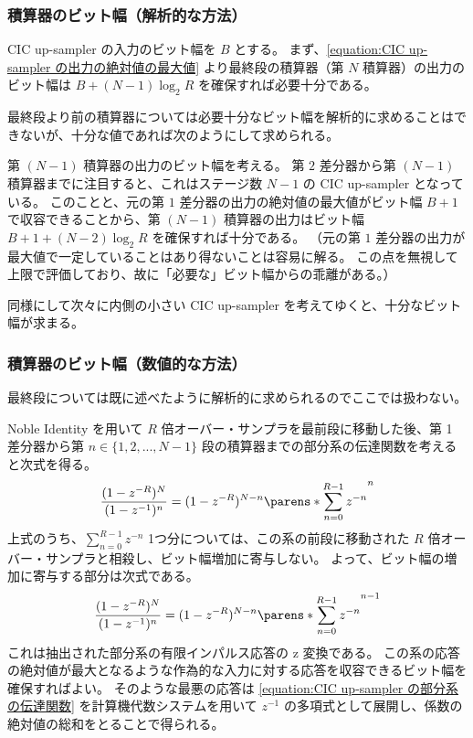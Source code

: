         \subsubsection{積算器のビット幅（解析的な方法）}
            CIC up-sampler の入力のビット幅を $B$ とする。
            まず、\cref{equation:CIC up-sampler の出力の絶対値の最大値} より最終段の積算器（第 $N$ 積算器）の出力のビット幅は $B + (N-1)\log_2 R$ を確保すれば必要十分である。
            \par
            最終段より前の積算器については必要十分なビット幅を解析的に求めることはできないが、十分な値であれば次のようにして求められる。
            \par
            第 $(N-1)$ 積算器の出力のビット幅を考える。
            第 $2$ 差分器から第 $(N-1)$ 積算器までに注目すると、これはステージ数 $N-1$ の CIC up-sampler となっている。
            このことと、元の第 $1$ 差分器の出力の絶対値の最大値がビット幅 $B+1$ で収容できることから、第 $(N-1)$ 積算器の出力はビット幅 $B + 1 + (N-2)\log_2 R$ を確保すれば十分である。
            （元の第 $1$ 差分器の出力が最大値で一定していることはあり得ないことは容易に解る。
            この点を無視して上限で評価しており、故に「必要な」ビット幅からの乖離がある。）
            \par
            同様にして次々に内側の小さい CIC up-sampler を考えてゆくと、十分なビット幅が求まる。
        \subsubsection{積算器のビット幅（数値的な方法）}
            最終段については既に述べたように解析的に求められるのでここでは扱わない。
            \par
            Noble Identity を用いて $R$ 倍オーバー・サンプラを最前段に移動した後、第 1 差分器から第 $n\in\{1,2,...,N-1\}$ 段の積算器までの部分系の伝達関数を考えると次式を得る。
            \[ \frac{(1-z^{-R})^N}{(1-z^{-1})^n} = (1-z^{-R})^{N-n}\parens*{\sum_{n=0}^{R-1} z^{-n}}^n \]
            上式のうち、$\sum_{n=0}^{R-1} z^{-n}$ 1つ分については、この系の前段に移動された $R$ 倍オーバー・サンプラと相殺し、ビット幅増加に寄与しない。
            よって、ビット幅の増加に寄与する部分は次式である。
            \begin{equation}
                \frac{(1-z^{-R})^N}{(1-z^{-1})^n} = (1-z^{-R})^{N-n}\parens*{\sum_{n=0}^{R-1} z^{-n}}^{n-1} \label{equation:CIC up-sampler の部分系の伝達関数}
            \end{equation}
            これは抽出された部分系の有限インパルス応答の z 変換である。
            この系の応答の絶対値が最大となるような作為的な入力に対する応答を収容できるビット幅を確保すればよい。
            そのような最悪の応答は \cref{equation:CIC up-sampler の部分系の伝達関数} を計算機代数システムを用いて $z^{-1}$ の多項式として展開し、係数の絶対値の総和をとることで得られる。
